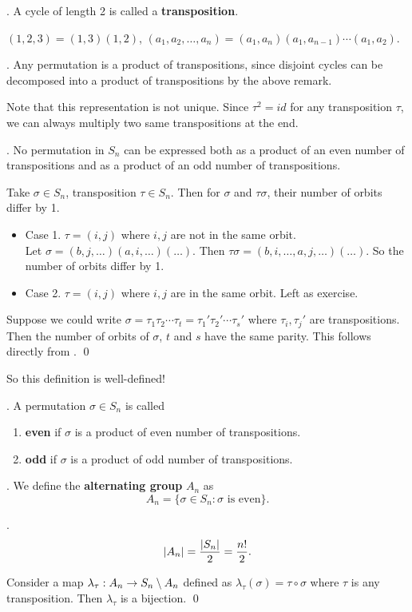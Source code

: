 .  A cycle of length 2 is called a \textbf{transposition}.

\rmk \((1, 2, 3) = (1, 3) (1, 2)\), \((a_1, a_2, \dots, a_n) = (a_1, a_n) (a_1, a_{n - 1}) \cdots (a_1, a_2)\).

\cor. Any permutation is a product of transpositions, since disjoint cycles can be decomposed into a product of transpositions by the above remark.

Note that this representation is not unique. Since \(\tau^2 = id\) for any transposition \(\tau\), we can always multiply two same transpositions at the end.

\thm. No permutation in \(S_n\) can be expressed both as a product of an even number of transpositions and as a product of an odd number of transpositions.

\pf {} Take \(\sigma \in S_n\), transposition \(\tau \in S_n\). Then for \(\sigma\) and \(\tau\sigma\), their number of orbits differ by 1.
\begin{itemize}
    \item Case 1. \(\tau = (i, j)\) where \(i, j\) are not in the same orbit. \\
    Let \(\sigma = (b, j, \dots) (a, i, \dots) (\dots)\). Then \(\tau\sigma = (b, i, \dots, a, j, \dots)(\dots)\). So the number of orbits differ by 1.
    \item Case 2. \(\tau = (i, j)\) where \(i, j\) are in the same orbit. Left as exercise.
\end{itemize}

 Suppose we could write \(\sigma = \tau_1\tau_2\cdots\tau_t = \tau_1'\tau_2'\cdots\tau_s'\) where \(\tau_i, \tau_j'\) are transpositions. Then the number of orbits of \(\sigma\), \(t\) and \(s\) have the same parity. This follows directly from . \qed

So this definition is well-defined!

. A permutation \(\sigma \in S_n\) is called
\begin{enumerate}
    \item \textbf{even} if \(\sigma\) is a product of even number of transpositions.
    \item \textbf{odd} if \(\sigma\) is a product of odd number of transpositions.
\end{enumerate}

.  We define the \textbf{alternating group} \(A_n\) as
\[
    A_n = \{\sigma \in S_n : \sigma \text{ is even}\}.
\]

\thm.
\[
    \left| A_n \right| = \frac{\left| S_n \right|}{2} = \frac{n!}{2}.
\]

\pf Consider a map \(\lambda_\tau: A_n \rightarrow S_n \setminus A_n\) defined as \(\lambda_\tau(\sigma) = \tau\circ\sigma\) where \(\tau\) is any transposition. Then \(\lambda_\tau\) is a bijection. \qed

\smallskip
